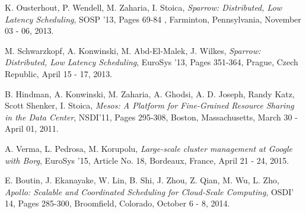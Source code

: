 \documentclass[11pt]{article}
\begin{document}
\begin{thebibliography}{9}

  K. Ousterhout, P. Wendell, M. Zaharia, I. Stoica,
  \textit{Sparrow: Distributed, Low Latency Scheduling},
  SOSP '13,
  Pages 69-84 ,
  Farminton, Pennsylvania,
  November 03 - 06,
  2013.

  M. Schwarzkopf, A. Konwinski, M. Abd-El-Malek, J. Wilkes,
  \textit{Sparrow: Distributed, Low Latency Scheduling},
  EuroSys '13,
  Pages 351-364,
  Prague, Czech Republic,
  April 15 - 17,
  2013.
  
  B. Hindman, A. Konwinski, M. Zaharia, A. Ghodsi, A. D. Joseph, Randy Katz, Scott Shenker, I. Stoica,
  \textit{Mesos: A Platform for Fine-Grained Resource Sharing in the Data Center},
  NSDI'11,
  Pages 295-308,
  Boston, Massachusetts,
  March 30 - April 01,
  2011.
  
  A. Verma, L. Pedrosa, M. Korupolu,
  \textit{Large-scale cluster management at Google with Borg},
  EuroSys '15,
  Article No. 18,
  Bordeaux, France,
  April 21 - 24,
  2015.

  E. Boutin, J. Ekanayake, W. Lin, B. Shi, J. Zhou, Z. Qian, M. Wu, L. Zho,
  \textit{Apollo: Scalable and Coordinated Scheduling for Cloud-Scale Computing},
  OSDI' 14,
  Pages 285-300,
  Broomfield, Colorado,
  October 6 - 8,
  2014.

\end{thebibliography}
\end{document}
